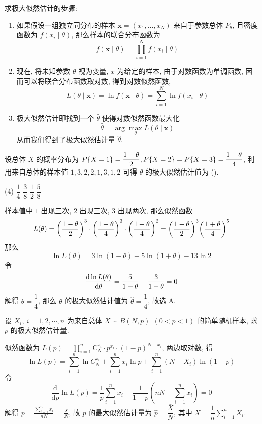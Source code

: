 求极大似然估计的步骤:
\begin{enumerate}[label=(\arabic{*})]
    \item 如果假设一组独立同分布的样本 $ \boldsymbol{x}=\left(x_{1}, \ldots, x_{N}\right) $ 来自于参数总体 $ P_{\theta} $, 且密度函数为 $ f\left(x_{i} \mid \theta\right) $, 那么样本的联合分布函数为
          $$
              f(\boldsymbol{x} \mid \theta)=\prod_{i=1}^{N} f\left(x_{i} \mid \theta\right)
          $$
    \item 现在, 将未知参数 $ \theta $ 视为变量, $ x $ 为给定的样本, 由于对数函数为单调函数, 因而可以将联合分布函数取对数, 得到对数似然函数,
          $$
              L(\theta \mid \boldsymbol{x})=\ln f(\boldsymbol{x} \mid \theta)=\sum_{i=1}^{N} \ln f\left(x_{i} \mid \theta\right)
          $$
    \item 极大似然估计即找到一个 $ \hat{\theta} $ 使得对数似然函数最大化
          $$
              \hat{\theta}=\arg \max _{\theta} L(\theta \mid \boldsymbol{x})
          $$
          从而我们得到了极大似然估计量 $ \hat{\theta} $.
\end{enumerate}

\begin{example}
    设总体 $X$ 的概率分布为 $P\qty{X=1}=\dfrac{1-\theta}{2},P\qty{X=2}=P\qty{X=3}=\dfrac{1+\theta}{4}$, 利用来自总体的样本值 $1,3,2,2,1,3,1,2$ 可得 $\theta$ 的极大似然估计值为 (\quad).
    \begin{tasks}(4)
        \task $\dfrac{1}{4}$
        \task $\dfrac{3}{8}$
        \task $\dfrac{1}{2}$
        \task $\dfrac{5}{8}$
    \end{tasks}
\end{example}
\begin{solution}
    样本值中 $1$ 出现三次, $2$ 出现三次, $3$ 出现两次, 那么似然函数
    $$
        L(\theta)=\qty(\dfrac{1-\theta}{2})^3\cdot \qty(\dfrac{1+\theta}{4})^3\cdot \qty(\dfrac{1+\theta}{4})^2=\qty(\dfrac{1-\theta}{2})^3\qty(\dfrac{1+\theta}{4})^5
    $$
    那么
    $$
        \ln L(\theta)=3\ln(1-\theta)+5\ln(1+\theta)-13\ln 2
    $$
    令 $$
        \dv{\ln L(\theta)}{\theta}=\dfrac{5}{1+\theta}-\dfrac{3}{1-\theta}=0
    $$
    解得 $\theta=\dfrac{1}{4}$, 那么 $\theta$ 的极大似然估计值为 $\hat{\theta}=\dfrac{1}{4}$, 故选 A.
\end{solution}

\begin{example}
    设 $X_i,~i=1,2,\cdots,n$ 为来自总体 $X\sim B(N,p)~~(0<p<1)$ 的简单随机样本, 求 $p$ 的极大似然估计量.
\end{example}
\begin{solution}
    似然函数为 $\displaystyle L(p)=\prod_{i=1}^{n} \mathrm{C}_{N}^{x_{i}} \cdot p^{x_{i}} \cdot(1-p)^{N-x_{i}} $, 两边取对数, 得
    $$\ln L(p)=\sum_{i=1}^{n} \ln C_{N}^{x_{i}}+\sum_{i=1}^{n} x_{i} \ln p+\sum_{i=1}^{n}\left(N-X_{i}\right) \ln (1-p)$$
    令 $$\frac{\mathrm{d}}{\mathrm{d} p} \ln L(p)=\frac{1}{p} \sum_{i=1}^{n} x_{i}-\frac{1}{1-p}\left(n N-\sum_{i=1}^{n} x_{i}\right)=0$$
    解得 $\displaystyle p=\frac{\displaystyle \sum_{i=1}^{n} x_{i}}{n N}=\frac{\bar{X}}{N} $, 故 $ p $ 的最大似然估计量为 $ \hat{p}=\dfrac{\bar{X}}{N} $,
    其中 $ \displaystyle\bar{X}=\dfrac{1}{n} \sum_{i=1}^{n} X_{i} .$
\end{solution}

